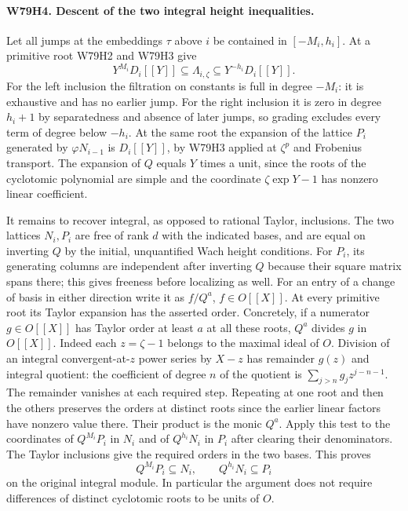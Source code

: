 \paragraph{W79H4. Descent of the two integral height inequalities.}
Let all jumps at the embeddings $\tau$ above $i$ be contained in
$[-M_i,h_i]$. At a primitive root W79H2 and W79H3 give
\[
  Y^{M_i}D_i[[Y]]\subseteq\Lambda_{i,\zeta}
                 \subseteq Y^{-h_i}D_i[[Y]].
\]
For the left inclusion the filtration on constants is full in
degree $-M_i$: it is exhaustive and has no earlier jump. For
the right inclusion it is zero in degree $h_i+1$ by separatedness
and absence of later jumps, so grading excludes every term of
degree below $-h_i$. At the same root the expansion of the
lattice $P_i$ generated by $\varphi N_{i-1}$ is $D_i[[Y]]$,
by W79H3 applied at $\zeta^p$ and Frobenius transport.
The expansion of $Q$ equals $Y$ times a unit, since the roots
of the cyclotomic polynomial are simple and the coordinate
$\zeta\exp Y-1$ has nonzero linear coefficient.

It remains to recover integral, as opposed to rational Taylor,
inclusions. The two lattices $N_i,P_i$ are free of rank $d$ with
the indicated bases, and are equal on inverting $Q$ by the
initial, unquantified Wach height conditions. For $P_i$, its
generating columns are independent after inverting $Q$ because
their square matrix spans there; this gives freeness before
localizing as well. For an entry of a change of basis in either
direction write it as $f/Q^a$, $f\in O[[X]]$. At every primitive
root its Taylor expansion has the asserted order. Concretely,
if a numerator $g\in O[[X]]$ has Taylor order at least $a$ at
all these roots, $Q^a$ divides $g$ in $O[[X]]$. Indeed each
$z=\zeta-1$ belongs to the maximal ideal of $O$. Division of an
integral convergent-at-$z$ power series by $X-z$ has remainder
$g(z)$ and integral quotient: the coefficient of degree $n$ of
the quotient is $\sum_{j>n}g_j z^{j-n-1}$.
The remainder vanishes at each required step. Repeating at one
root and then the others preserves the orders at distinct roots
since the earlier linear factors have nonzero value there.
Their product is the monic $Q^a$. Apply this test to the
coordinates of $Q^{M_i}P_i$ in $N_i$ and of $Q^{h_i}N_i$ in
$P_i$ after clearing their denominators. The Taylor inclusions
give the required orders in the two bases. This proves
\[
 Q^{M_i}P_i\subseteq N_i,\qquad Q^{h_i}N_i\subseteq P_i
\]
on the original integral module. In particular the argument
does not require differences of distinct cyclotomic roots to
be units of $O$.

